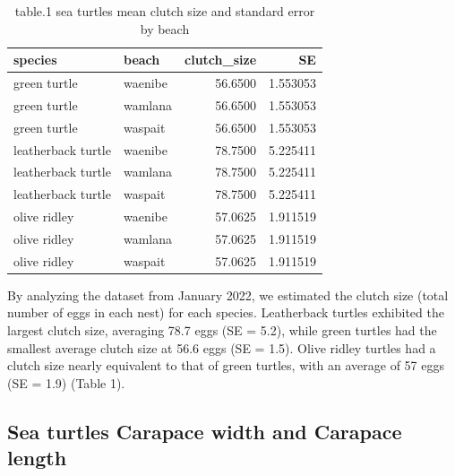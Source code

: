 \documentclass[
]{article}
\begin{document}
\begin{table}
\centering\centering
\caption{\label{tab:unnamed-chunk-2}table.1 sea turtles mean clutch size and standard error by beach }
\centering
\begin{tabular}[t]{l|l|r|r}
\hline
species & beach & clutch\_size & SE\\
\hline
green turtle & waenibe & 56.6500 & 1.553053\\
\hline
green turtle & wamlana & 56.6500 & 1.553053\\
\hline
green turtle & waspait & 56.6500 & 1.553053\\
\hline
leatherback turtle & waenibe & 78.7500 & 5.225411\\
\hline
leatherback turtle & wamlana & 78.7500 & 5.225411\\
\hline
leatherback turtle & waspait & 78.7500 & 5.225411\\
\hline
olive ridley & waenibe & 57.0625 & 1.911519\\
\hline
olive ridley & wamlana & 57.0625 & 1.911519\\
\hline
olive ridley & waspait & 57.0625 & 1.911519\\
\hline
\end{tabular}
\end{table}

By analyzing the dataset from January 2022, we estimated the clutch size
(total number of eggs in each nest) for each species. Leatherback
turtles exhibited the largest clutch size, averaging 78.7 eggs (SE =
5.2), while green turtles had the smallest average clutch size at 56.6
eggs (SE = 1.5). Olive ridley turtles had a clutch size nearly
equivalent to that of green turtles, with an average of 57 eggs (SE =
1.9) (Table 1).

\hypertarget{sea-turtles-carapace-width-and-carapace-length}{%
\subsection{Sea turtles Carapace width and Carapace
length}\label{sea-turtles-carapace-width-and-carapace-length}}
\end{document}
